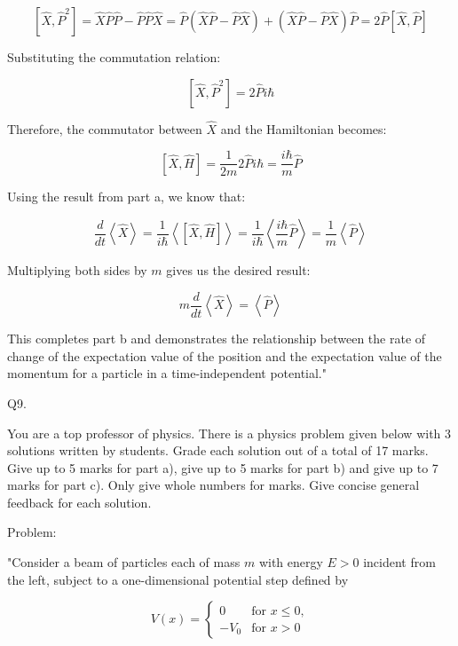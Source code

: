 \[
\left[ \hat{X}, \hat{P}^2\right] = \hat{X}\hat{P}\hat{P} - \hat{P}\hat{P}\hat{X} = \hat{P}\left( \hat{X}\hat{P} - \hat{P}\hat{X} \right) + \left( \hat{X}\hat{P} - \hat{P}\hat{X} \right)\hat{P} = 2\hat{P}\left[ \hat{X}, \hat{P} \right]
\]

Substituting the commutation relation:

\[
\left[ \hat{X}, \hat{P}^2\right] = 2\hat{P}i\hbar
\]

Therefore, the commutator between \(\hat{X}\) and the Hamiltonian becomes:

\[
\left[ \hat{X}, \hat{H}\right] = \frac{1}{2m}2\hat{P}i\hbar = \frac{i\hbar}{m}\hat{P}
\]

Using the result from part a, we know that:

\[
\frac{d}{dt}\left<\hat{X}\right> = \frac{1}{i\hbar}\left< \left[ \hat{X}, \hat{H} \right] \right> = \frac{1}{i\hbar}\left< \frac{i\hbar}{m}\hat{P} \right> = \frac{1}{m}\left<\hat{P}\right>
\]

Multiplying both sides by \(m\) gives us the desired result:

\[
m\frac{d}{dt}\left<\hat{X}\right> = \left<\hat{P}\right>
\]

This completes part b and demonstrates the relationship between the rate of change of the expectation value of the position and the expectation value of the momentum for a particle in a time-independent potential."



                           Q9. 

You are a top professor of physics. There is a physics problem given below with 3 solutions written by students. Grade each solution out of a total of 17 marks. Give up to 5 marks for part a), give up to 5 marks for part b) and give up to 7 marks for part c). Only give whole numbers for marks. Give concise general feedback for each solution. 

Problem:

"Consider a beam of particles each of mass \( m \) with energy \( E > 0 \) incident from the left, subject to a one-dimensional potential step defined by

\[ V(x) = \begin{cases}
0 & \text{for } x \leq 0,\\
-V_{0}  & \text{for } x > 0 
\end{cases} \]

